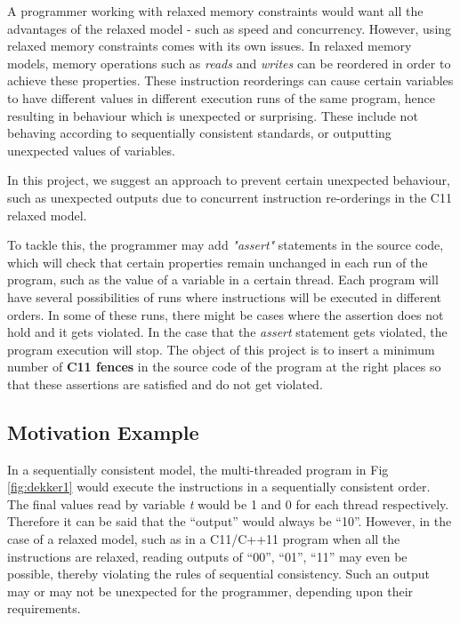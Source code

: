 \par
A programmer working with relaxed memory constraints would want all the advantages of the relaxed model - such as speed and concurrency. However, using relaxed memory constraints comes with its own issues. In relaxed memory models, memory operations such as \textit{reads} and \textit{writes} can be reordered in order to achieve these properties. These instruction reorderings can cause certain variables to have different values in different execution runs of the same program, hence resulting in behaviour which is unexpected or surprising. These include not behaving according to sequentially consistent standards, or outputting unexpected values of variables.

\par
In this project, we suggest an approach to prevent certain unexpected behaviour, such as unexpected outputs due to concurrent instruction re-orderings in the C11 relaxed model.

\par
To tackle this, the programmer may add \textit{"assert"} statements in the source code, which will check that certain properties remain unchanged in each run of the program, such as the value of a variable in a certain thread. Each program will have several possibilities of runs where instructions will be executed in different orders. In some of these runs, there might be cases where the assertion does not hold and it gets violated. In the case that the \textit{assert} statement gets violated, the program execution will stop. The object of this project is to insert a minimum number of \textbf{C11 fences} in the source code of the program at the right places so that these assertions are satisfied and do not get violated.

\subsection{Motivation Example}

\par
In a sequentially consistent model, the multi-threaded program in Fig \ref{fig:dekker1} would execute the instructions in a sequentially consistent order. The final values read by variable \textit{t} would be 1 and 0 for each thread respectively. Therefore it can be said that the ``output'' would always be ``10''. However, in the case of a relaxed model, such as in a C11/C++11 program when all the instructions are relaxed, reading outputs of ``00'', ``01'', ``11'' may even be possible, thereby violating the rules of sequential consistency. Such an output may or may not be unexpected for the programmer, depending upon their requirements.


